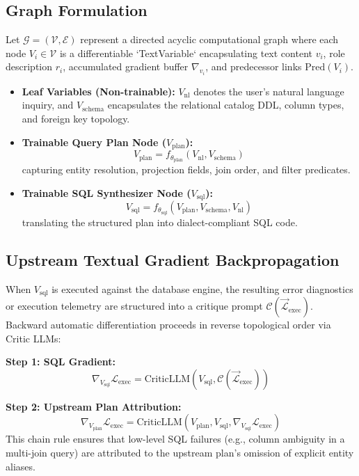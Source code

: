 \documentclass[conference]{IEEEtran}
\begin{document}
\subsection{Graph Formulation}
Let $\mathcal{G} = (\mathcal{V}, \mathcal{E})$ represent a directed acyclic computational graph where each node $V_i \in \mathcal{V}$ is a differentiable `TextVariable` encapsulating text content $v_i$, role description $r_i$, accumulated gradient buffer $\nabla_{v_i}$, and predecessor links $\text{Pred}(V_i)$.
\begin{itemize}
    \item \textbf{Leaf Variables (Non-trainable):}
    $V_{\text{nl}}$ denotes the user's natural language inquiry, and $V_{\text{schema}}$ encapsulates the relational catalog DDL, column types, and foreign key topology.
    \item \textbf{Trainable Query Plan Node ($V_{\text{plan}}$):}
    \begin{equation}
        V_{\text{plan}} = f_{\theta_{\text{plan}}}(V_{\text{nl}}, V_{\text{schema}})
    \end{equation}
    capturing entity resolution, projection fields, join order, and filter predicates.
    \item \textbf{Trainable SQL Synthesizer Node ($V_{\text{sql}}$):}
    \begin{equation}
        V_{\text{sql}} = f_{\theta_{\text{sql}}}(V_{\text{plan}}, V_{\text{schema}}, V_{\text{nl}})
    \end{equation}
    translating the structured plan into dialect-compliant SQL code.
\end{itemize}

\subsection{Upstream Textual Gradient Backpropagation}
When $V_{\text{sql}}$ is executed against the database engine, the resulting error diagnostics or execution telemetry are structured into a critique prompt $\mathcal{C}(\vec{\mathcal{L}}_{\text{exec}})$. Backward automatic differentiation proceeds in reverse topological order via Critic LLMs:

\textbf{Step 1: SQL Gradient:}
\begin{equation}
    \nabla_{V_{\text{sql}}} \mathcal{L}_{\text{exec}} = \text{CriticLLM}(V_{\text{sql}}, \mathcal{C}(\vec{\mathcal{L}}_{\text{exec}}))
\end{equation}

\textbf{Step 2: Upstream Plan Attribution:}
\begin{equation}
    \nabla_{V_{\text{plan}}} \mathcal{L}_{\text{exec}} = \text{CriticLLM}\left(V_{\text{plan}}, V_{\text{sql}}, \nabla_{V_{\text{sql}}} \mathcal{L}_{\text{exec}}\right)
\end{equation}
This chain rule ensures that low-level SQL failures (e.g., column ambiguity in a multi-join query) are attributed to the upstream plan's omission of explicit entity aliases.
\end{document}
